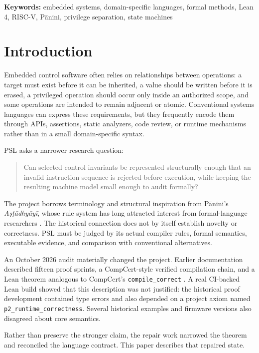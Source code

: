 \documentclass[11pt,a4paper]{article}
\begin{document}
\noindent\textbf{Keywords:}
embedded systems, domain-specific languages, formal methods, Lean 4,
RISC-V, P\={a}nini, privilege separation, state machines

\section{Introduction}

Embedded control software often relies on relationships between operations:
a target must exist before it can be inherited, a value should be written
before it is erased, a privileged operation should occur only inside an
authorized scope, and some operations are intended to remain adjacent or
atomic. Conventional systems languages can express these requirements, but
they frequently encode them through APIs, assertions, static analyzers, code
review, or runtime mechanisms rather than in a small domain-specific syntax.

PSL asks a narrower research question:

\begin{quote}
Can selected control invariants be represented structurally enough that an
invalid instruction sequence is rejected before execution, while keeping the
resulting machine model small enough to audit formally?
\end{quote}

The project borrows terminology and structural inspiration from
P\={a}nini's \emph{A\d{s}\d{t}\={a}dhy\={a}y\={i}}, whose rule system has
long attracted interest from formal-language researchers
\cite{ingerman1967panini,kadvany2016panini}. The historical connection does
not by itself establish novelty or correctness. PSL must be judged by its
actual compiler rules, formal semantics, executable evidence, and comparison
with conventional alternatives.

An October 2026 audit materially changed the project. Earlier documentation
described fifteen proof sprints, a CompCert-style verified compilation chain,
and a Lean theorem analogous to CompCert's
\texttt{compile\_correct} \cite{leroy2009compcert}. A real CI-backed Lean
build showed that this description was not justified: the historical proof
development contained type errors and also depended on a project axiom named
\texttt{p2\_runtime\_correctness}. Several historical examples and firmware
versions also disagreed about core semantics.

Rather than preserve the stronger claim, the repair work narrowed the theorem
and reconciled the language contract. This paper describes that repaired
state.
\end{document}

